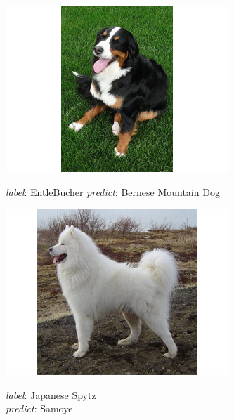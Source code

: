 \documentclass{article}
\begin{document}
\begin{figure}
	\begin{subfigure}{0.32\linewidth}
		\centering
		\includegraphics[width=\linewidth]{pics/f2}
		\caption{}
		\emph{label}: EntleBucher \newline \emph{predict}: Bernese Mountain Dog
		\label{fig:f2}
	\end{subfigure} 
	\begin{subfigure}{0.32\linewidth}
		\centering
		\includegraphics[width=\linewidth]{pics/d2}
		\caption{}
		\emph{label}: Japanese Spytz \\ \emph{predict}: Samoye 
		\label{fig:d2}
	\end{subfigure} 
	\begin{subfigure}{0.32\linewidth}
		\centering

\end{subfigure}
\end{figure}
\end{document}

